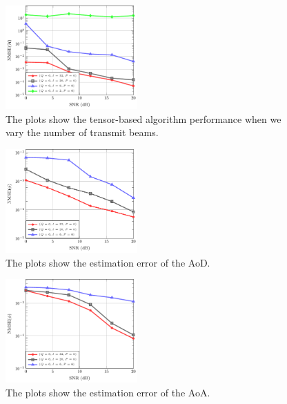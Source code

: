 \documentclass[conference]{IEEEtran}
\begin{document}
\begin{figure}[!t]
  \centering
  \includegraphics[width=0.45\textwidth]{fig/snr_nmse}
      \vspace{-0.4cm}
  \caption{The plots show the tensor-based algorithm performance when we vary the
    number of transmit beams. }
  \label{fig:tx_beams}
\end{figure}


\begin{figure}[!t]
  \centering
  \includegraphics[width=0.45\textwidth]{fig/snr_angleTx_error}
      \vspace{-0.4cm}
  \caption{The plots show the estimation error of the \gls{AoD}.}
  \label{fig:angleTx_error}
\end{figure}


\begin{figure}[!t]
  \centering
  \includegraphics[width=0.45\textwidth]{fig/snr_angleRx_error}
      \vspace{-0.4cm}
  \caption{The plots show the estimation error of the \gls{AoA}.}
  \label{fig:angleRx_error}
\end{figure}
\end{document}
